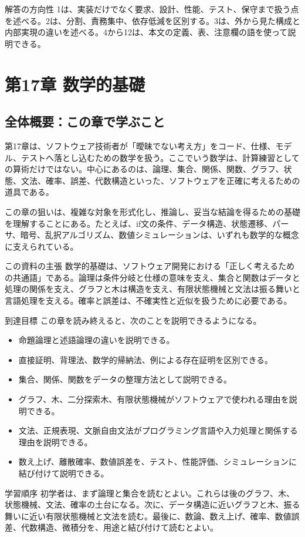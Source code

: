 \documentclass[a4paper,11pt]{ltjsarticle}
\numberwithin{figure}{section}
\numberwithin{table}{section}
\begin{document}
\begin{pointbox}{解答の方向性}
1は、実装だけでなく要求、設計、性能、テスト、保守まで扱う点を述べる。2は、分割、責務集中、依存低減を区別する。3は、外から見た構成と内部実現の違いを述べる。4から12は、本文の定義、表、注意欄の語を使って説明できる。

\end{pointbox}

\section{第17章 数学的基礎}

\subsection{全体概要：この章で学ぶこと}
第17章は、ソフトウェア技術者が「曖昧でない考え方」をコード、仕様、モデル、テストへ落とし込むための数学を扱う。ここでいう数学は、計算練習としての算術だけではない。中心にあるのは、論理、集合、関係、関数、グラフ、状態、文法、確率、誤差、代数構造といった、ソフトウェアを正確に考えるための道具である。

この章の狙いは、複雑な対象を形式化し、推論し、妥当な結論を得るための基礎を理解することにある。たとえば、if文の条件、データ構造、状態遷移、パーサ、暗号、乱択アルゴリズム、数値シミュレーションは、いずれも数学的な概念に支えられている。

\begin{notebox}{この資料の主張}
数学的基礎は、ソフトウェア開発における「正しく考えるための共通語」である。論理は条件分岐と仕様の意味を支え、集合と関数はデータと処理の関係を支え、グラフと木は構造を支え、有限状態機械と文法は振る舞いと言語処理を支える。確率と誤差は、不確実性と近似を扱うために必要である。
\end{notebox}
到達目標 この章を読み終えると、次のことを説明できるようになる。

\begin{itemize}[leftmargin=2em]
\item 命題論理と述語論理の違いを説明できる。
\item 直接証明、背理法、数学的帰納法、例による存在証明を区別できる。
\item 集合、関係、関数をデータの整理方法として説明できる。
\item グラフ、木、二分探索木、有限状態機械がソフトウェアで使われる理由を説明できる。
\item 文法、正規表現、文脈自由文法がプログラミング言語や入力処理と関係する理由を説明できる。
\item 数え上げ、離散確率、数値誤差を、テスト、性能評価、シミュレーションに結び付けて説明できる。
\end{itemize}
学習順序 初学者は、まず論理と集合を読むとよい。これらは後のグラフ、木、状態機械、文法、確率の土台になる。次に、データ構造に近いグラフと木、振る舞いに近い有限状態機械と文法を読む。最後に、数論、数え上げ、確率、数値誤差、代数構造、微積分を、用途と結び付けて読むとよい。
\end{document}
